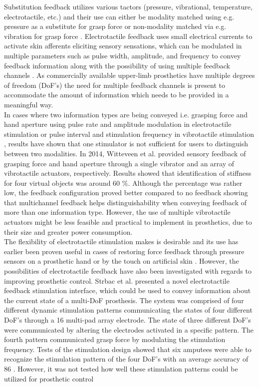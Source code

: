 Substitution feedback utilizes various tactors (pressure, vibrational, temperature, electrotactile, etc.) and their use can either be modality matched using e.g. pressure as a substitute for grasp force \cite{Godfrey2017} or non-modality matched via e.g. vibration for grasp force \cite{Ninu2014,Nabeel2016}. 
Electrotactile feedback uses small electrical currents to activate skin afferents eliciting sensory sensations, which can be modulated in multiple parameters such as pulse width, amplitude, and frequency to convey feedback information along with the possibility of using multiple feedback channels \cite{Geng2012}. As commercially available upper-limb prosthetics have multiple degrees of freedom (DoF's) \cite{Cordella2016} the need for multiple feedback channels is present to accommodate the amount of information which needs to be provided in a meaningful way. \\
%
In cases where two information types are being conveyed i.e. grasping force and hand aperture using pulse rate and amplitude modulation in electrotactile stimulation \cite{Prior1976} or pulse interval and stimulation frequency in vibrotactile stimulation \cite{Chatterjee2008}, results have shown that one stimulator is not sufficient for users to distinguish between two modalities. In 2014, \cite{Witteveen2014} Witteveen et al. provided sensory feedback of grasping force and hand aperture through a single vibrator and an array of vibrotactile actuators, respectively. Results showed that identification of stiffness for four virtual objects was around 60 $\percent$. Although the percentage was rather low, the feedback configuration proved better compared to no feedback showing that multichannel feedback helps distinguishability when conveying feedback of more than one information type. \cite{Witteveen2014} However, the use of multiple vibrotactile actuators might be less feasible and practical to implement in prosthetics, due to their size and greater power consumption.  \\
%
The flexibility of electrotactile stimulation makes is desirable and its use has earlier been proven useful in cases of restoring force feedback through pressure sensors on a prosthetic hand or by the touch on artificial skin \cite{Hartmann2014,Franceschi2015}. However, the possibilities of electrotactile feedback have also been investigated with regards to improving prosthetic control. Strbac et al. \cite{Strbac2016} presented a novel electrotactile feedback stimulation interface, which could be used to convey information about the current state of a multi-DoF prosthesis. The system was comprised of four different dynamic stimulation patterns communicating the states of four different DoF's through a 16 multi-pad array electrode. The state of three different DoF's were communicated by altering the electrodes activated in a specific pattern. The fourth pattern communicated grasp force by modulating the stimulation frequency. Tests of the stimulation design showed that six amputees were able to recognize the stimulation pattern of the four DoF's with an average accuracy of 86 \percent. \cite{Strbac2016} However, it was not tested how well these stimulation patterns could be utilized for prosthetic control  \\   
